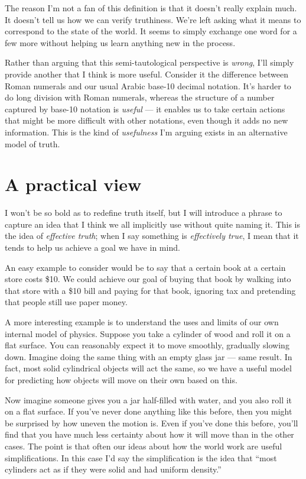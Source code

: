 \documentclass[20pt,]{extarticle}
\begin{document}
The reason I'm not a fan of this definition is that it doesn't really
explain much. It doesn't tell us how we can verify truthiness. We're
left asking what it means to correspond to the state of the world. It
seems to simply exchange one word for a few more without helping us
learn anything new in the process.

Rather than arguing that this semi-tautological perspective is
\emph{wrong}, I'll simply provide another that I think is more useful.
Consider it the difference between Roman numerals and our usual Arabic
base-10 decimal notation. It's harder to do long division with Roman
numerals, whereas the structure of a number captured by base-10 notation
is \emph{useful} --- it enables us to take certain actions that might be
more difficult with other notations, even though it adds no new
information. This is the kind of \emph{usefulness} I'm arguing exists in
an alternative model of truth.

\section{A practical view}\label{a-practical-view}

I won't be so bold as to redefine truth itself, but I will introduce a
phrase to capture an idea that I think we all implicitly use without
quite naming it. This is the idea of \emph{effective truth}; when I say
something is \emph{effectively true}, I mean that it tends to help us
achieve a goal we have in mind.

An easy example to consider would be to say that a certain book at a
certain store costs \$10. We could achieve our goal of buying that book
by walking into that store with a \$10 bill and paying for that book,
ignoring tax and pretending that people still use paper money.

A more interesting example is to understand the uses and limits of our
own internal model of physics. Suppose you take a cylinder of wood and
roll it on a flat surface. You can reasonably expect it to move
smoothly, gradually slowing down. Imagine doing the same thing with an
empty glass jar --- same result. In fact, most solid cylindrical objects
will act the same, so we have a useful model for predicting how objects
will move on their own based on this.

Now imagine someone gives you a jar half-filled with water, and you also
roll it on a flat surface. If you've never done anything like this
before, then you might be surprised by how uneven the motion is. Even if
you've done this before, you'll find that you have much less certainty
about how it will move than in the other cases. The point is that often
our ideas about how the world work are useful simplifications. In this
case I'd say the simplification is the idea that ``most cylinders act as
if they were solid and had uniform density.''
\end{document}
